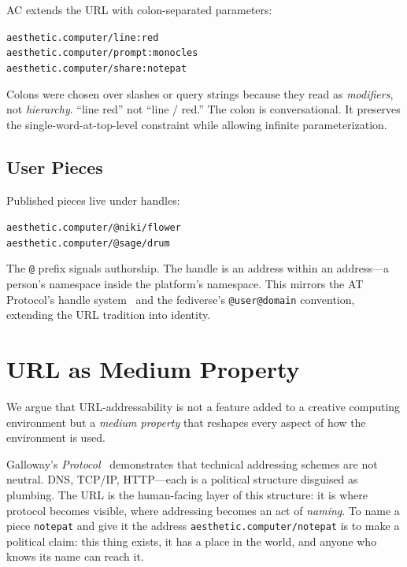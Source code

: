 \documentclass[10pt,letterpaper,twocolumn]{article}
\newcommand{\code}[1]{\texttt{#1}}
\begin{document}
AC extends the URL with colon-separated parameters:

\begin{center}
\code{aesthetic.computer/line:red}\\
\code{aesthetic.computer/prompt:monocles}\\
\code{aesthetic.computer/share:notepat}
\end{center}

Colons were chosen over slashes or query strings because they read as \emph{modifiers}, not \emph{hierarchy}. ``line red'' not ``line / red.'' The colon is conversational. It preserves the single-word-at-top-level constraint while allowing infinite parameterization.

\subsection{User Pieces}

Published pieces live under handles:

\begin{center}
\code{aesthetic.computer/@niki/flower}\\
\code{aesthetic.computer/@sage/drum}
\end{center}

The \code{@} prefix signals authorship. The handle is an address within an address---a person's namespace inside the platform's namespace. This mirrors the AT Protocol's handle system~\citep{atproto2024oauth} and the fediverse's \code{@user@domain} convention, extending the URL tradition into identity.

\section{URL as Medium Property}

We argue that URL-addressability is not a feature added to a creative computing environment but a \emph{medium property} that reshapes every aspect of how the environment is used.

Galloway's \emph{Protocol}~\citep{galloway2004protocol} demonstrates that technical addressing schemes are not neutral. DNS, TCP/IP, HTTP---each is a political structure disguised as plumbing. The URL is the human-facing layer of this structure: it is where protocol becomes visible, where addressing becomes an act of \emph{naming}. To name a piece \code{notepat} and give it the address \code{aesthetic.computer/notepat} is to make a political claim: this thing exists, it has a place in the world, and anyone who knows its name can reach it.
\end{document}
